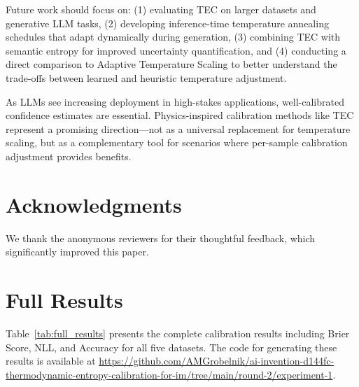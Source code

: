 \documentclass[11pt,letterpaper]{article}
\begin{document}
Future work should focus on: (1) evaluating TEC on larger datasets and generative LLM tasks, (2) developing inference-time temperature annealing schedules that adapt dynamically during generation, (3) combining TEC with semantic entropy \cite{Kuhn2023} for improved uncertainty quantification, and (4) conducting a direct comparison to Adaptive Temperature Scaling \cite{Joy2023} to better understand the trade-offs between learned and heuristic temperature adjustment.

As LLMs see increasing deployment in high-stakes applications, well-calibrated confidence estimates are essential. Physics-inspired calibration methods like TEC represent a promising direction---not as a universal replacement for temperature scaling, but as a complementary tool for scenarios where per-sample calibration adjustment provides benefits.

\section*{Acknowledgments}

We thank the anonymous reviewers for their thoughtful feedback, which significantly improved this paper.




\appendix

\section{Full Results}
\label{app:full_results}

Table~\ref{tab:full_results} presents the complete calibration results including Brier Score, NLL, and Accuracy for all five datasets. The code for generating these results is available at \url{https://github.com/AMGrobelnik/ai-invention-d144fc-thermodynamic-entropy-calibration-for-im/tree/main/round-2/experiment-1}.
\end{document}
